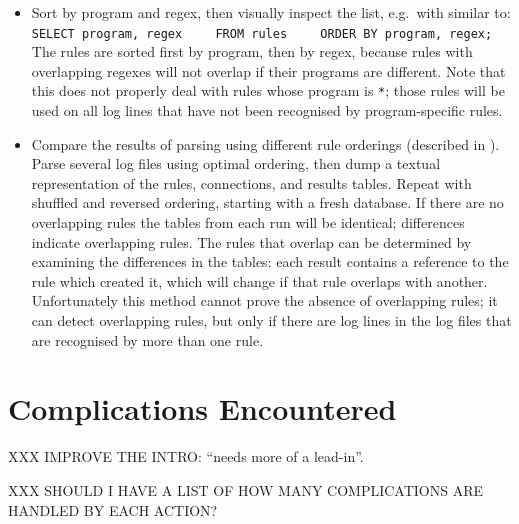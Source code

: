 \begin{itemize}

    \item Sort by program and regex, then visually inspect the list, e.g.\
        with  similar to:      \newline{}
        \verb!SELECT program, regex!        \newline{}
        \verb!    FROM rules!               \newline{}
        \verb!    ORDER BY program, regex;! \newline{}
        The rules are sorted first by program, then by regex, because rules
        with overlapping regexes will not overlap if their programs are
        different.  Note that this does not properly deal with rules whose
        program is \texttt{*}; those rules will be used on all log lines
        that have not been recognised by program-specific rules.

    \item Compare the results of parsing using different rule orderings
        (described in \sectionref{rule ordering for efficiency}).  Parse
        several log files using optimal ordering, then dump a textual
        representation of the rules, connections, and results tables.
        Repeat with shuffled and reversed ordering, starting with a fresh
        database.  If there are no overlapping rules the tables from each
        run will be identical; differences indicate overlapping rules.  The
        rules that overlap can be determined by examining the differences
        in the tables: each result contains a reference to the rule which
        created it, which will change if that rule overlaps with another.
        Unfortunately this method cannot prove the absence of overlapping
        rules; it can detect overlapping rules, but only if there are log
        lines in the log files that are recognised by more than one rule.

\end{itemize}

\section{Complications Encountered}

\label{complications}

XXX IMPROVE THE INTRO\@: ``needs more of a lead-in''.

XXX SHOULD I HAVE A LIST OF HOW MANY COMPLICATIONS ARE HANDLED BY EACH
ACTION\@?

